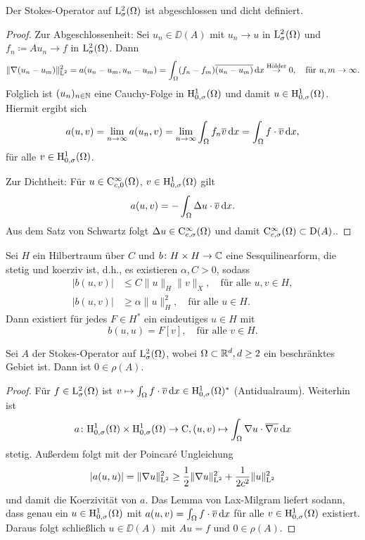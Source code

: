 \begin{prop}
  Der Stokes-Operator auf $\mathrm{L}_\sigma^2(\Omega)$ ist abgeschlossen und dicht definiert.
\end{prop}

\begin{proof}
  Zur Abgeschlossenheit: Sei $u_n \in \DD(A)$ mit $u_n \to u$ in $\mathrm{L}^2_\sigma(\Omega)$ und $f_n \coloneqq A u_n \to f$ in $\mathrm{L}^2_\sigma(\Omega)$.
  Dann
  $$
  \|\nabla(u_n - u_m)\|_{\mathrm{L}^2}^2 
  = a(u_n - u_m, u_n - u_m)
  = \int_\Omega (f_n - f_m) \overline{(u_n - u_m)} \, {\operatorname{d}\!{x}}
  \overset{\text{Hölder}}{\to} 0, \quad\text{für } u,m \to \infty.
  $$
  Folglich ist $(u_n)_{n \in \mathbb{N}}$ eine Cauchy-Folge in $\mathrm{H}_{0,\sigma}^1(\Omega)$ und damit $u \in \mathrm{H}_{0,\sigma}^1(\Omega)$.
  Hiermit ergibt sich
  $$
  a(u,v) 
  = \lim_{n \to \infty} a(u_n,v)
  = \lim_{n \to \infty} \int_\Omega f_n \overline{v} \, {\operatorname{d}\!{x}}
  = \int_\Omega f \cdot \overline v \, {\operatorname{d}\!{x}},
  $$
 für alle $v \in \mathrm{H}_{0,\sigma}^1(\Omega)$.

 Zur Dichtheit: Für $u \in \mathrm{C}_{c,0}^\infty(\Omega)$, $v \in \mathrm{H}_{0,\sigma}^1(\Omega)$ gilt
 $$
 a(u,v) = -\int_\Omega \Delta u \cdot \overline v \, {\operatorname{d}\!{x}}.
 $$
 Aus dem Satz von Schwartz folgt $\Delta u \in \mathrm{C}_{c,\sigma}^\infty(\Omega)$ und damit $\mathrm{C}_{c,\sigma}^\infty(\Omega) \subset \mathrm{D}(A)$..
\end{proof}

\begin{lem*}
   Sei $H$ ein Hilbertraum über $C$ und $b \colon H \times H \to \mathbb{C}$ eine Sesquilinearform, die stetig und koerziv ist, d.h., es existieren $\alpha, C > 0$, sodass 
   \begin{align*}
     |b(u,v)| &\leq C \|u\|_H \|v\|_X, \quad \text{für alle }u,v \in H, \\
     |b(u,v)| &\geq \alpha \|u\|_H^2, \quad\text{für alle } u \in H.
   \end{align*}
   Dann existiert für jedes $F \in H^*$ ein eindeutiges $u \in H$ mit 
   $$
   b(u,u) = F[v], \quad\text{für alle } v \in H.
   $$
\end{lem*}

\begin{prop}
  Sei $A$ der Stokes-Operator auf $\mathrm{L}_\sigma^2(\Omega)$, wobei $\Omega \subset \mathbb{R}^d, d \geq 2$ ein beschränktes Gebiet ist.
  Dann ist $0 \in \rho(A)$.
\end{prop}

\begin{proof}
  Für $f \in \mathrm{L}_\sigma^2(\Omega)$ ist $v \mapsto \int_\Omega f \cdot \overline v \, {\operatorname{d}\!{x}} \in \mathrm{H}_{0,\sigma}^1(\Omega)^*$ (Antidualraum).
  Weiterhin ist $$a \colon \mathrm{H}_{0,\sigma}^1(\Omega) \times \mathrm{H}_{0,\sigma}^1(\Omega) \to \mathrm{C}, (u,v) \mapsto \int_\Omega \nabla u \cdot \overline{\nabla v} \, {\operatorname{d}\!{x}}$$ stetig.
  Außerdem folgt mit der Poincar\'e Ungleichung
  $$
  |a(u,u)| = \|\nabla u\|_{\mathrm{L}^2}^2 \geq \frac{1}{2} \|\nabla u\|_{\mathrm{L}^2}^2 + \frac{1}{2 c^2} \|u\|_{\mathrm{L}^2}^2
  $$
  und damit die Koerzivität von $a$.
  Das Lemma von Lax-Milgram liefert sodann, dass genau ein $u \in \mathrm{H}_{0,\sigma}^1(\Omega)$ mit $a(u,v) = \int_\Omega f \cdot \overline v \, {\operatorname{d}\!{x}}$ für alle $v \in \mathrm{H}_{0,\sigma}^1(\Omega)$ existiert.
  Daraus folgt schließlich $u \in \DD(A)$ mit $A u = f$ und $0 \in \rho(A)$.
\end{proof}

